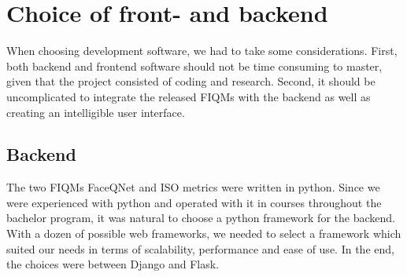 \begin{table}[h]
\end{table}

\section{Choice of front- and backend}
When choosing development software, we had to take some considerations. First, both backend and frontend software should not be time consuming to master, given that the project consisted of coding and research. Second, it should be uncomplicated to integrate the released FIQMs with the backend as well as creating an intelligible user interface. 

\subsection*{Backend}
The two FIQMs FaceQNet and ISO metrics were written in python. Since we were experienced with python and operated with it in courses throughout the bachelor program, it was natural to choose a python framework for the backend. With a dozen of possible web frameworks, we needed to select a framework which suited our needs in terms of scalability, performance and ease of use. In the end, the choices were between Django and Flask. 


